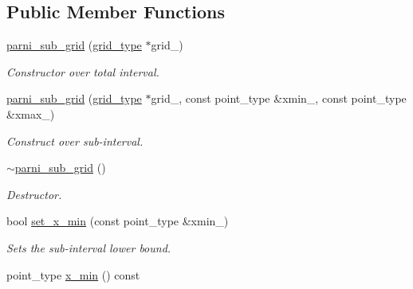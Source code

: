 \subsection*{Public Member Functions}
\begin{DoxyCompactItemize}
\item 
\hypertarget{a00391_afcba111887f0dc48096f01bd5d0ae04d}{\hyperlink{a00391_afcba111887f0dc48096f01bd5d0ae04d}{parni\-\_\-sub\-\_\-grid} (\hyperlink{a00385}{grid\-\_\-type} $\ast$grid\-\_\-)}\label{a00391_afcba111887f0dc48096f01bd5d0ae04d}

\begin{DoxyCompactList}\small\item\em Constructor over total interval. \end{DoxyCompactList}\item 
\hypertarget{a00391_a75e2fa48500b8981d8cd6dbacf5e5d7f}{\hyperlink{a00391_a75e2fa48500b8981d8cd6dbacf5e5d7f}{parni\-\_\-sub\-\_\-grid} (\hyperlink{a00385}{grid\-\_\-type} $\ast$grid\-\_\-, const point\-\_\-type \&xmin\-\_\-, const point\-\_\-type \&xmax\-\_\-)}\label{a00391_a75e2fa48500b8981d8cd6dbacf5e5d7f}

\begin{DoxyCompactList}\small\item\em Construct over sub-\/interval. \end{DoxyCompactList}\item 
\hypertarget{a00391_a85603e4fbf4ef064b344fa7f6e3e8e6f}{\hyperlink{a00391_a85603e4fbf4ef064b344fa7f6e3e8e6f}{$\sim$parni\-\_\-sub\-\_\-grid} ()}\label{a00391_a85603e4fbf4ef064b344fa7f6e3e8e6f}

\begin{DoxyCompactList}\small\item\em Destructor. \end{DoxyCompactList}\item 
\hypertarget{a00391_a5afc8d9446b6774808d4b3c2657cc624}{bool \hyperlink{a00391_a5afc8d9446b6774808d4b3c2657cc624}{set\-\_\-x\-\_\-min} (const point\-\_\-type \&xmin\-\_\-)}\label{a00391_a5afc8d9446b6774808d4b3c2657cc624}

\begin{DoxyCompactList}\small\item\em Sets the sub-\/interval lower bound. \end{DoxyCompactList}\item 
\hypertarget{a00391_adb78126c4a0bffdddff4cbac0bce2148}{point\-\_\-type \hyperlink{a00391_adb78126c4a0bffdddff4cbac0bce2148}{x\-\_\-min} () const }\label{a00391_adb78126c4a0bffdddff4cbac0bce2148}


\end{DoxyCompactItemize}
